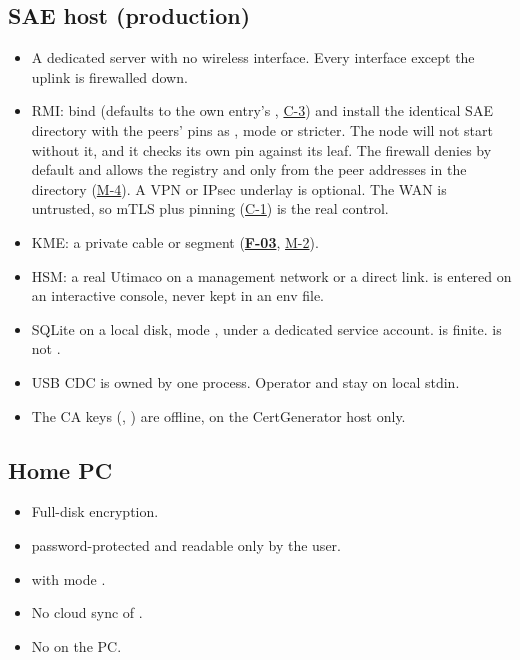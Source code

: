 \documentclass[11pt,a4paper]{article}
\newcommand{\fid}[1]{\textbf{#1}}
\begin{document}
\subsection{SAE host (production)}
\begin{itemize}
\item A dedicated server with no wireless interface. Every interface except the uplink is firewalled down.
\item RMI: bind  (defaults to the own entry's , \hyperref[c:C-3]{C-3}) and install the identical SAE directory with the peers' pins as , mode  or stricter. The node will not start without it, and it checks its own pin against its leaf. The firewall denies by default and allows the registry  and  only from the peer addresses in the directory (\hyperref[m:M-4]{M-4}). A VPN or IPsec underlay is optional. The WAN is untrusted, so mTLS plus pinning (\hyperref[c:C-1]{C-1}) is the real control.
\item KME: a private cable or segment (\hyperref[f:F-03]{\fid{F-03}}, \hyperref[m:M-2]{M-2}).
\item HSM: a real Utimaco on a management network or a direct link.  is entered on an interactive console, never kept in an env file.
\item SQLite on a local disk, mode , under a dedicated service account.  is finite.  is not .
\item USB CDC is owned by one process. Operator  and  stay on local stdin.
\item The CA keys (, ) are offline, on the CertGenerator host only.
\end{itemize}

\subsection{Home PC}
\begin{itemize}
\item Full-disk encryption.
\item {} password-protected and readable only by the user.
\item {} with mode .
\item No cloud sync of .
\item No  on the PC.
\end{itemize}
\end{document}
